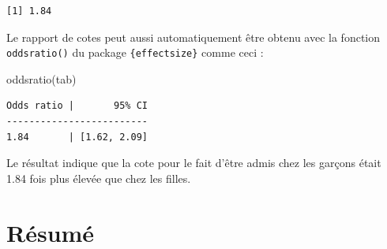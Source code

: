 \documentclass[
  letterpaper,
]{book}
\newenvironment{Shaded}{\begin{snugshade}}{\end{snugshade}}
\newcommand{\FunctionTok}[1]{\textcolor[rgb]{0.28,0.35,0.67}{#1}}
\newcommand{\NormalTok}[1]{\textcolor[rgb]{0.00,0.23,0.31}{#1}}
\begin{document}
\begin{verbatim}
[1] 1.84
\end{verbatim}

Le rapport de cotes peut aussi automatiquement être obtenu avec la
fonction \texttt{oddsratio()} du package \texttt{\{effectsize\}} comme
ceci :

\begin{Shaded}
\begin{Highlighting}[]
\FunctionTok{oddsratio}\NormalTok{(tab)}
\end{Highlighting}
\end{Shaded}

\begin{verbatim}
Odds ratio |       95% CI
-------------------------
1.84       | [1.62, 2.09]
\end{verbatim}

Le résultat indique que la cote pour le fait d'être admis chez les
garçons était 1.84 fois plus élevée que chez les filles.

\section{Résumé}\label{ruxe9sumuxe9-4}
\end{document}
